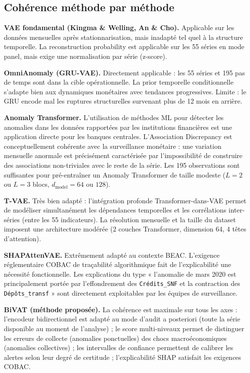 \documentclass[12pt,a4paper]{article}
\begin{document}
\subsection{Cohérence méthode par méthode}

\textbf{VAE fondamental (Kingma \& Welling, An \& Cho).} Applicable sur les données mensuelles après stationnarisation, mais inadapté tel quel à la structure temporelle. La reconstruction probability est applicable sur les 55 séries en mode panel, mais exige une normalisation par série (z-score).

\textbf{OmniAnomaly (GRU-VAE).} Directement applicable : les 55 séries et 195 pas de temps sont dans la cible opérationnelle. La prior temporelle conditionnelle s'adapte bien aux dynamiques monétaires avec tendances progressives. Limite : le GRU encode mal les ruptures structurelles survenant plus de 12 mois en arrière.

\textbf{Anomaly Transformer.} L'utilisation de méthodes ML pour détecter les anomalies dans les données rapportées par les institutions financières est une application directe pour les banques centrales. L'Association Discrepancy est conceptuellement cohérente avec la surveillance monétaire : une variation mensuelle anormale est précisément caractérisée par l'impossibilité de construire des associations non-triviales avec le reste de la série. Les 195 observations sont suffisantes pour pré-entraîner un Anomaly Transformer de taille modeste ($L = 2$ ou $L = 3$ blocs, $d_{\mathrm{model}} = 64$ ou $128$).

\textbf{T-VAE.} Très bien adapté : l'intégration profonde Transformer-dans-VAE permet de modéliser simultanément les dépendances temporelles et les corrélations inter-séries (entre les 55 indicateurs). La résolution mensuelle et la taille du dataset imposent une architecture modérée (2 couches Transformer, dimension 64, 4 têtes d'attention).

\textbf{SHAPAttenVAE.} Extrêmement adapté au contexte BEAC. L'exigence réglementaire COBAC de traçabilité algorithmique fait de l'explicabilité une nécessité fonctionnelle. Les explications du type « l'anomalie de mars 2020 est principalement portée par l'effondrement des \texttt{Crédits\_SNF} et la contraction des \texttt{Dépôts\_transf} » sont directement exploitables par les équipes de surveillance.

\textbf{BiVAT (méthode proposée).} La cohérence est maximale sur tous les axes : l'encodeur bidirectionnel est adapté au mode d'audit a posteriori (toute la série disponible au moment de l'analyse) ; le score multi-niveaux permet de distinguer les erreurs de collecte (anomalies ponctuelles) des chocs macroéconomiques (anomalies collectives) ; les intervalles de confiance permettent de calibrer les alertes selon leur degré de certitude ; l'explicabilité SHAP satisfait les exigences COBAC.
\end{document}
